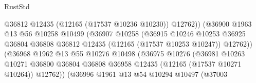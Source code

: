 \begin{lexlean}{RustStd}
\begin{coremodule}
                                              @36812
                                              @12435
                                              (@12165 (@17537 @10236 @10230))
                                              @12762))
                                          (@36900
                                            @1963
                                            @13
                                            @56
                                            @10258
                                            @10499
                                            (@36907
                                              @10258
                                              (@36915
                                                @10246
                                                @10253
                                                @36925
                                                @36804
                                                @36808
                                                @36812
                                                @12435
                                                (@12165 (@17537 @10253 @10247))
                                                @12762))
                                            (@36968
                                              @1962
                                              @13
                                              @55
                                              @10276
                                              @10498
                                              (@36975
                                                @10276
                                                (@36981
                                                  @10263
                                                  @10271
                                                  @36800
                                                  @36804
                                                  @36808
                                                  @36958
                                                  @12435
                                                  (@12165 (@17537 @10271 @10264))
                                                  @12762))
                                              (@36996
                                                @1961
                                                @13
                                                @54
                                                @10294
                                                @10497
                                                (@37003

\end{coremodule}
\end{lexlean}

